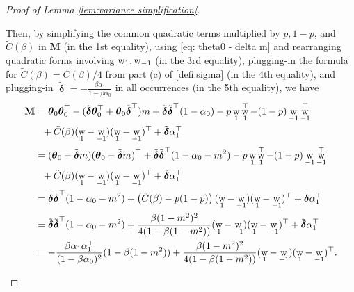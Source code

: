 \documentclass[preprint,reqno]{imsart}
\newcommand{\ttheta}{\boldsymbol{\theta}}
\DeclareMathOperator{\w}{{\mathnormal \mathbf{w}}}
\DeclareMathOperator{\ddelta}{\boldsymbol{\delta}}
\begin{document}
\begin{appendix}
\begin{proof}[Proof of Lemma \ref{lem:variance simplification}]
\begin{enumerate}[(a)]
Then, by simplifying the common quadratic terms multiplied by $p, 1-p$, and $\tilde{C}(\beta)$ in $\mathbf{M}$ (in the 1st equality), using \eqref{eq: theta0 - delta m} and rearranging quadratic forms involving $\w_1,\w_{-1}$ (in the 3rd equality), plugging-in the formula for $\tilde{C}(\beta)=C(\beta)/4$ from part (c) of \cref{defi:sigma} (in the 4th equality), and plugging-in $\tilde{\ddelta} = - \frac{\beta\alpha_1}{1-\beta \alpha_0}$ in all occurrences (in the 5th equality), we have %
\begin{align*}
    \mathbf{M} &= \ttheta_0 \ttheta_0^\top - (\tilde{\ddelta} \ttheta_0^\top + \ttheta_0 \tilde{\ddelta}^\top)m + \tilde{\ddelta} \tilde{\ddelta}^\top (1-\alpha_0) - p \w_1 \w_1^\top - (1-p) \w_{-1} \w_{-1}^\top \\
    & ~~ + \tilde{C}(\beta)(\w_1 - \w_{-1}) (\w_1 - \w_{-1})^\top + \tilde{\ddelta} \alpha_1^\top \\
    &= (\ttheta_0 - \tilde{\ddelta} m)(\ttheta_0 - \tilde{\ddelta} m)^\top + \tilde{\ddelta} \tilde{\ddelta}^\top (1 - \alpha_0 - m^2) - p \w_1 \w_1^\top - (1-p) \w_{-1} \w_{-1}^\top \\
    & ~~ +\tilde{C}(\beta)(\w_1 - \w_{-1}) (\w_1 - \w_{-1})^\top + \tilde{\ddelta} \alpha_1^\top \\
    &= \tilde{\ddelta} \tilde{\ddelta}^\top (1 - \alpha_0 - m^2) + \left( \tilde{C}(\beta) -p(1-p) \right) (\w_1 - \w_{-1}) (\w_1 - \w_{-1})^\top + \tilde{\ddelta}  \alpha_1^\top \\
    &=  \tilde{\ddelta} \tilde{\ddelta}^\top (1 - \alpha_0 - m^2) + \frac{\beta (1-m^2)^2}{4(1 - \beta (1-m^2))} (\w_1 - \w_{-1}) (\w_1 - \w_{-1})^\top + \tilde{\ddelta}  \alpha_1^\top \\
    &= - \frac{\beta \alpha_1 \alpha_1^\top}{(1- \beta \alpha_0)^2}(1 - \beta (1-m^2)) + \frac{\beta (1-m^2)^2}{4(1 - \beta (1-m^2))} (\w_1 - \w_{-1}) (\w_1 - \w_{-1})^\top.
\end{align*}


\end{enumerate}
\end{proof}
\end{appendix}
\end{document}
